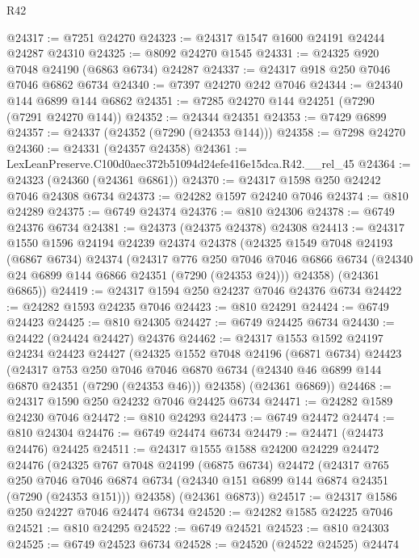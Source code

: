 \begin{lexlean}{R42}
\begin{coremodule}
{@24317 := @7251 @24270
@24323 := @24317 @1547 @1600 @24191 @24244 @24287 @24310
@24325 := @8092 @24270 @1545
@24331 := @24325 @920 @7048 @24190 (@6863 @6734) @24287
@24337 := @24317 @918 @250 @7046 @7046 @6862 @6734
@24340 := @7397 @24270 @242 @7046
@24344 := @24340 @144 @6899 @144 @6862
@24351 := @7285 @24270 @144 @24251 (@7290 (@7291 @24270 @144))
@24352 := @24344 @24351
@24353 := @7429 @6899
@24357 := @24337 (@24352 (@7290 (@24353 @144)))
@24358 := @7298 @24270
@24360 := @24331 (@24357 @24358)
@24361 := LexLeanPreserve.C100d0aec372b51094d24efe416e15dca.R42.__rel_45
@24364 := @24323 (@24360 (@24361 @6861))
@24370 := @24317 @1598 @250 @24242 @7046 @24308 @6734
@24373 := @24282 @1597 @24240 @7046
@24374 := @810 @24289
@24375 := @6749 @24374
@24376 := @810 @24306
@24378 := @6749 @24376 @6734
@24381 := @24373 (@24375 @24378) @24308
@24413 := @24317
    @1550
    @1596
    @24194
    @24239
    @24374
    @24378
    (@24325
      @1549
      @7048
      @24193
      (@6867 @6734)
      @24374
      (@24317
        @776
        @250
        @7046
        @7046
        @6866
        @6734
        (@24340 @24 @6899 @144 @6866 @24351 (@7290 (@24353 @24)))
        @24358)
      (@24361 @6865))
@24419 := @24317 @1594 @250 @24237 @7046 @24376 @6734
@24422 := @24282 @1593 @24235 @7046
@24423 := @810 @24291
@24424 := @6749 @24423
@24425 := @810 @24305
@24427 := @6749 @24425 @6734
@24430 := @24422 (@24424 @24427) @24376
@24462 := @24317
    @1553
    @1592
    @24197
    @24234
    @24423
    @24427
    (@24325
      @1552
      @7048
      @24196
      (@6871 @6734)
      @24423
      (@24317
        @753
        @250
        @7046
        @7046
        @6870
        @6734
        (@24340 @46 @6899 @144 @6870 @24351 (@7290 (@24353 @46)))
        @24358)
      (@24361 @6869))
@24468 := @24317 @1590 @250 @24232 @7046 @24425 @6734
@24471 := @24282 @1589 @24230 @7046
@24472 := @810 @24293
@24473 := @6749 @24472
@24474 := @810 @24304
@24476 := @6749 @24474 @6734
@24479 := @24471 (@24473 @24476) @24425
@24511 := @24317
    @1555
    @1588
    @24200
    @24229
    @24472
    @24476
    (@24325
      @767
      @7048
      @24199
      (@6875 @6734)
      @24472
      (@24317
        @765
        @250
        @7046
        @7046
        @6874
        @6734
        (@24340 @151 @6899 @144 @6874 @24351 (@7290 (@24353 @151)))
        @24358)
      (@24361 @6873))
@24517 := @24317 @1586 @250 @24227 @7046 @24474 @6734
@24520 := @24282 @1585 @24225 @7046
@24521 := @810 @24295
@24522 := @6749 @24521
@24523 := @810 @24303
@24525 := @6749 @24523 @6734
@24528 := @24520 (@24522 @24525) @24474
}
\end{coremodule}
\end{lexlean}
